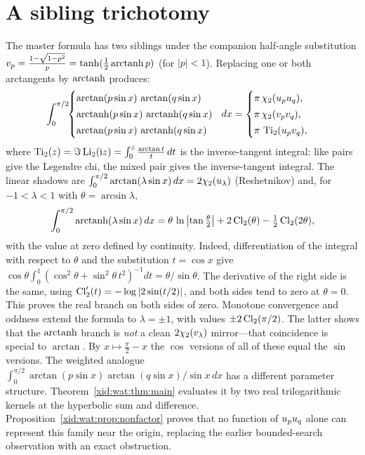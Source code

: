 \section{A sibling trichotomy}
The master formula has two siblings under the companion half-angle substitution
$v_p=\frac{1-\sqrt{1-p^2}}{p}=\tanh(\tfrac12\operatorname{arctanh} p)$ (for $|p|<1$). Replacing one or both
arctangents by $\operatorname{arctanh}$ produces:
\begin{equation}\label{cleo:eq:trich}
  \int_0^{\pi/2}\!\!\begin{cases}\arctan(p\sin x)\,\arctan(q\sin x)\\[2pt]
  \operatorname{arctanh}(p\sin x)\,\operatorname{arctanh}(q\sin x)\\[2pt]
  \arctan(p\sin x)\,\operatorname{arctanh}(q\sin x)\end{cases}\!\!dx=
  \begin{cases}\pi\,\chi_2(u_pu_q),\\[2pt]\pi\,\chi_2(v_pv_q),\\[2pt]\pi\,\operatorname{Ti}_2(u_pv_q),\end{cases}
\end{equation}
where $\operatorname{Ti}_2(z)=\Im\operatorname{Li}_2(\mathrm iz)=\int_0^z\frac{\arctan t}{t}\,dt$ is the inverse-tangent integral: like
pairs give the Legendre chi, the mixed pair gives the inverse-tangent integral. The linear shadows are
$\int_0^{\pi/2}\arctan(\lambda\sin x)\,dx=2\chi_2(u_\lambda)$ (Reshetnikov) and, for $-1<\lambda<1$ with $\theta=\arcsin\lambda$,
\begin{equation}\label{cleo:eq:lintanh}
  \int_0^{\pi/2}\operatorname{arctanh}(\lambda\sin x)\,dx=\theta\,\ln\left|\tan\tfrac\theta2\right|+2\operatorname{Cl}_2(\theta)-\tfrac12\operatorname{Cl}_2(2\theta),
\end{equation}
with the value at zero defined by continuity. Indeed, differentiation of the
integral with respect to $\theta$ and the substitution $t=\cos x$ give
$\cos\theta\int_0^1(\cos^2\theta+\sin^2\theta\,t^2)^{-1}dt
=\theta/\sin\theta$. The derivative of the right side is the same,
using $\operatorname{Cl}_2'(t)=-\log|2\sin(t/2)|$, and both sides tend to zero at
$\theta=0$. This proves the real branch on both sides of zero. Monotone
convergence and oddness extend the formula to $\lambda=\pm1$, with values
$\pm2\operatorname{Cl}_2(\pi/2)$.
The latter shows that the $\operatorname{arctanh}$ branch is \emph{not} a clean $2\chi_2(v_\lambda)$ mirror---that
coincidence is special to $\arctan$. By $x\mapsto\frac\pi2-x$ the $\cos$ versions of all of these equal the
$\sin$ versions. The weighted analogue
$\int_0^{\pi/2}\arctan(p\sin x)\arctan(q\sin x)/\sin x\,dx$
has a different parameter structure. Theorem~\ref{xid:wat:thm:main}
evaluates it by two real trilogarithmic kernels at the hyperbolic sum
and difference. Proposition~\ref{xid:wat:prop:nonfactor} proves that no
function of $u_pu_q$ alone can represent this family near the origin,
replacing the earlier bounded-search observation with an exact obstruction.

